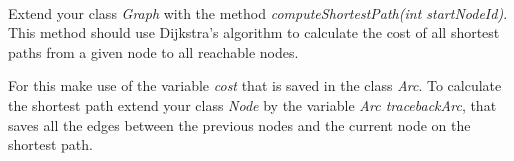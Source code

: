  \\
Extend your class  \emph{Graph} with the method \emph{computeShortestPath(int 
startNodeId)}. This method should use Dijkstra's algorithm to calculate the 
cost of all shortest paths from a given node to all reachable nodes. 

For this make use of the variable \emph{cost} that is saved in the class 
\emph{Arc}. To calculate the shortest path extend your class \emph{Node} by the 
variable \emph{Arc tracebackArc}, that saves all the edges between the previous 
nodes and the current node on the shortest path.